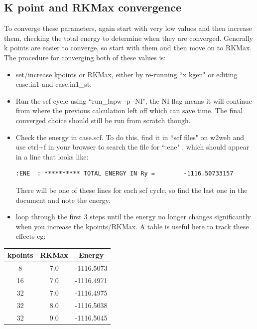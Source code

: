 \documentclass[12pt]{article}
\begin{document}
\subsection{K point and RKMax convergence}

To converge these parameters, again start with very low values and then increase them, checking the total energy to determine when they are converged.  Generally k points are easier to converge, so start with them and then move on to RKMax. The procedure for converging both of these values is:

\begin{itemize}
	\item set/increase kpoints or RKMax, either by re-running ``x kgen" or editing case.in1 and case.in1\_st.
	
	\item Run the scf cycle using ``run\_lapw -p -NI", the NI flag means it will continue from where the previous calculation left off which can save time. The final converged choice should still be run from scratch though.
	
	\item Check the energy in case.scf.  To do this, find it in ``scf files" on w2web and use ctrl+f in your browser to search the file for ``:ene" , which should appear in a line that looks like: 
	
		\begin{lstlisting}
:ENE  : ********** TOTAL ENERGY IN Ry =        -1116.50733157
		\end{lstlisting}
	
	There will be one of these lines for each scf cycle, so find the last one in the document and note the energy. 
	
	
	\item loop through the first 3 steps until the energy no longer changes significantly when you increase the kpoints/RKMax.  A table is useful here to track these effects eg:
	
\end{itemize}

\begin{table}[H]
	\centering
\begin{tabular}{ccc}

			kpoints & RKMax & Energy \\
			\hline
			8 & 7.0 &  -1116.5073\\
			16 & 7.0 & -1116.4971\\
			32 & 7.0 & -1116.4975\\
			32 & 8.0 & -1116.5038\\
			32 & 9.0 & -1116.5045\\
			
			

\end{tabular}

\end{table}
\end{document}
